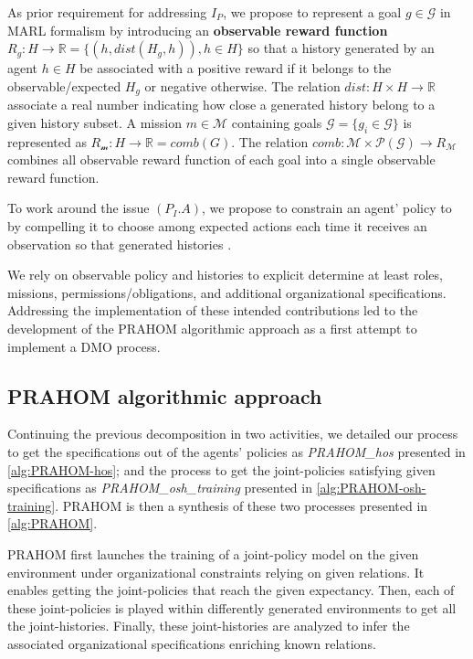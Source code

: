 \documentclass[runningheads]{llncs}
\newcounter{relation}
\newcounter{proof}
\begin{document}
As prior requirement for addressing $I_P$, we propose to represent a goal $g \in \mathcal{G}$ in MARL formalism by introducing an \textbf{observable reward function} $R_{g}: H \rightarrow \mathbb{R} = \{(h, dist(H_g,h)), h \in H\}$ so that a history generated by an agent $h \in H$ be associated with a positive reward if it belongs to the observable/expected $H_g$ or negative otherwise. The relation $dist: H \times H \rightarrow \mathbb{R}$ associate a real number indicating how close a generated history belong to a given history subset.
A mission $m \in \mathcal{M}$ containing goals $\mathcal{G} = \{g_i \in \mathcal{G}\}$ is represented as $R_{\mathcal{m}}: H \rightarrow \mathbb{R} = comb(G)$. The relation $comb: \mathcal{M} \times \mathcal{P}(\mathcal{G}) \rightarrow R_{\mathcal{M}}$ combines all observable reward function of each goal into a single observable reward function.

To work around the issue $(P_I.A)$, we propose to constrain an agent' policy to  by compelling it to choose among expected actions each time it receives an observation so that generated histories .

We rely on observable policy and histories to explicit determine at least roles, missions, permissions/obligations, and additional organizational specifications.
Addressing the implementation of these intended contributions led to the development of the PRAHOM algorithmic approach as a first attempt to implement a DMO process.







\subsection{PRAHOM algorithmic approach}

Continuing the previous decomposition in two activities, we detailed our process to get the specifications out of the agents' policies as \emph{PRAHOM\_hos} presented in \autoref{alg:PRAHOM-hos}; and the process to get the joint-policies satisfying given specifications as \emph{PRAHOM\_osh\_training} presented in \autoref{alg:PRAHOM-osh-training}. PRAHOM is then a synthesis of these two processes presented in \autoref{alg:PRAHOM}.

PRAHOM first launches the training of a joint-policy model on the given environment under organizational constraints relying on given relations. It enables getting the joint-policies that reach the given expectancy. Then, each of these joint-policies is played within differently generated environments to get all the joint-histories. Finally, these joint-histories are analyzed to infer the associated organizational specifications enriching known relations.
\end{document}
